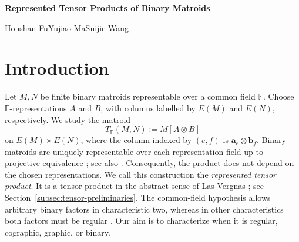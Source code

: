 \documentclass[12pt,a4paper]{article}
\numberwithin{equation}{section}
\newcommand{\F}{\mathbb F}
\theoremstyle{definition}
\theoremstyle{remark}
\begin{document}
\begin{center}
{\Large\bf
Represented Tensor Products of Binary Matroids}\\[10pt]
\end{center}

\begin{center}
Houshan Fu\quad Yujiao Ma\quad Suijie Wang
\end{center}

\begin{abstract}
For binary matroids \(M,N\) representable over a common field
\(\F\), the Kronecker product of their \(\F\)-representations defines a
matroid \(T_{\F}(M,N)\) independent of the chosen representations.
We classify when this represented tensor product is regular, cographic,
graphic, or binary.  For simple nonfree factors, regularity holds exactly
when, up to interchange, one factor is a cactus matroid and the other
is outerplanar, or one is a triangular cactus matroid and the other
is series--parallel.  Cographicity holds exactly in the first case.
For simple factors with nonempty ground sets, graphicity holds exactly
when one factor is free and the other is graphic.
For fixed factors, regularity, cographicity, and graphicity are
independent of the common representation field, although the
isomorphism type may vary with its characteristic.
Products of at least three simple nonfree factors are nonregular.
\vspace{1ex}\\
\noindent\textbf{Keywords:} represented tensor product; binary matroid;
regular matroid; cographic matroid; series--parallel matroid;
totally unimodular matrix
\vspace{1ex}\\
\noindent\textbf{Mathematics Subject Classification (2020):}
Primary 05B35; Secondary 05C10, 15A69.
\end{abstract}

\section{Introduction}\label{sec:introduction}
Let \(M,N\) be finite binary matroids representable over a common
field \(\F\).
Choose \(\F\)-representations \(A\) and \(B\), with columns labelled
by \(E(M)\) and \(E(N)\), respectively.  We study the matroid
\[
 T_{\F}(M,N):=M[A\otimes B]
\]
on \(E(M)\times E(N)\), where the column indexed by \((e,f)\) is
\(\boldsymbol a_e\otimes\boldsymbol b_f\).  Binary matroids are
uniquely representable over each representation field up to projective equivalence
\cite{brylawski-lucas}; see also \cite[Proposition~6.6.5]{oxley}.
Consequently, the product does not depend on the chosen
representations.  We call this construction the \emph{represented tensor product}.
It is a tensor product in the abstract sense of Las Vergnas
\cite{las-vergnas-products}; see Section~\ref{subsec:tensor-preliminaries}.
The common-field hypothesis allows arbitrary binary factors in
characteristic two, whereas in other characteristics both factors must
be regular \cite[Theorem~6.6.3]{oxley}.
Our aim is to characterize when it is regular, cographic, graphic, or binary.
\end{document}
